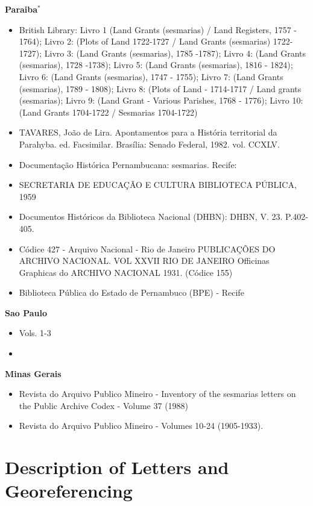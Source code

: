 \documentclass{article}
\begin{document}
\textbf{Paraiba$^*$}
\begin{itemize}
  \item British Library: Livro 1 (Land Grants (sesmarias) / Land Registers, 1757 - 1764); Livro 2: (Plots of Land 1722-1727 / Land Grants (sesmarias) 1722-1727); Livro 3: (Land Grants (sesmarias), 1785 -1787); Livro 4: (Land Grants (sesmarias), 1728 -1738); Livro 5: (Land Grants (sesmarias), 1816 - 1824); Livro 6: (Land Grants (sesmarias), 1747 - 1755); Livro 7: (Land Grants (sesmarias), 1789 - 1808); Livro 8: (Plots of Land - 1714-1717 / Land grants (sesmarias); Livro 9: (Land Grant - Various Parishes, 1768 - 1776); Livro 10: (Land Grants 1704-1722 / Sesmarias 1704-1722)
  \item TAVARES, João de Lira. Apontamentos para a História territorial da Parahyba. ed. Facsimilar. Brasília: Senado Federal, 1982. vol. CCXLV.
  \item Documentação Histórica Pernambucana: sesmarias. Recife:
  \item SECRETARIA DE EDUCAÇÃO E CULTURA BIBLIOTECA PÚBLICA, 1959
  \item Documentos Históricos da Biblioteca Nacional (DHBN): DHBN, V. 23. P.402-405.
  \item Códice 427 - Arquivo Nacional - Rio de Janeiro
  PUBLICAÇÕES DO ARCHIVO NACIONAL. VOL XXVII RIO DE
  JANEIRO Officinas Graphicas do ARCHIVO NACIONAL 1931. (Códice 155)
  \item Biblioteca Pública do Estado de Pernambuco (BPE) - Recife
  
\end{itemize}


\textbf{Sao Paulo}
\begin{itemize}
\item \textcite{noauthor_1921-qd} Vols. 1-3 
\item \textcite{Instituto-Historico-e-Geografico-de-Sao-Paulo1928-ej}
\end{itemize}

\textbf{Minas Gerais}
\begin{itemize}
  \item Revista do Arquivo Publico Mineiro - Inventory of the sesmarias letters on the Public Archive Codex - Volume 37 (1988)
  \item Revista do Arquivo Publico Mineiro - Volumes 10-24 (1905-1933). 
\end{itemize}

\clearpage

\section{Description of Letters and Georeferencing}
\label{app:appendix_data}
\end{document}
